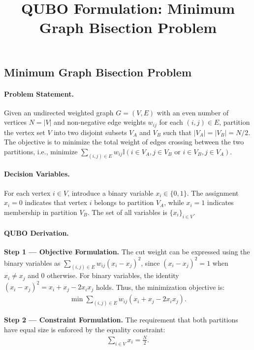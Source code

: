 \documentclass[12pt]{article}
\title{QUBO Formulation: Minimum Graph Bisection Problem}
\date{}
\begin{document}
\maketitle

\subsection*{Minimum Graph Bisection Problem}

\paragraph{Problem Statement.}
Given an undirected weighted graph $G = (V, E)$ with an even number of vertices $N = |V|$ and non-negative edge weights $w_{ij}$ for each $(i,j) \in E$, partition the vertex set $V$ into two disjoint subsets $V_A$ and $V_B$ such that $|V_A| = |V_B| = N/2$. The objective is to minimize the total weight of edges crossing between the two partitions, i.e., minimize $\sum_{(i,j) \in E} w_{ij} \mathbb{I}(i \in V_A, j \in V_B \text{ or } i \in V_B, j \in V_A)$.

\paragraph{Decision Variables.}
For each vertex $i \in V$, introduce a binary variable $x_i \in \{0, 1\}$. The assignment $x_i = 0$ indicates that vertex $i$ belongs to partition $V_A$, while $x_i = 1$ indicates membership in partition $V_B$. The set of all variables is $\{x_i\}_{i \in V}$.

\paragraph{QUBO Derivation.}
\textbf{Step 1 --- Objective Formulation.}
The cut weight can be expressed using the binary variables as $\sum_{(i,j) \in E} w_{ij} (x_i - x_j)^2$, since $(x_i - x_j)^2 = 1$ when $x_i \neq x_j$ and $0$ otherwise. For binary variables, the identity $(x_i - x_j)^2 = x_i + x_j - 2x_i x_j$ holds. Thus, the minimization objective is:
\begin{align}
    \min \sum_{(i,j) \in E} w_{ij} (x_i + x_j - 2x_i x_j).
\end{align}

\textbf{Step 2 --- Constraint Formulation.}
The requirement that both partitions have equal size is enforced by the equality constraint:
\begin{align}
    \sum_{i \in V} x_i = \frac{N}{2}.
\end{align}
\end{document}
